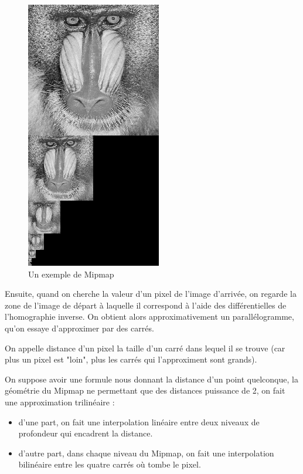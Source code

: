 \begin{figure}[h!]
\centering
\caption{Un exemple de Mipmap}
\includegraphics[scale=0.4]{MipMap_real} %
\end{figure}

Ensuite, quand on cherche la valeur d'un pixel de l'image d'arrivée, on regarde la zone de l'image de départ à laquelle il correspond à l'aide des différentielles de l'homographie inverse. On obtient alors approximativement un parallélogramme, qu'on essaye d'approximer par des carrés.


On appelle distance d'un pixel la taille d'un carré dans lequel il se trouve (car plus un pixel est "loin", plus les carrés qui l'approximent sont grands). 

On suppose avoir une formule nous donnant la distance d'un point quelconque, la géométrie du Mipmap ne permettant que des distances puissance de 2, on fait une approximation trilinéaire : 

\begin{itemize}
  \item d'une part, on fait une interpolation linéaire entre deux niveaux de profondeur qui encadrent la distance.
  \item d'autre part, dans chaque niveau du Mipmap, on fait une interpolation bilinéaire entre les quatre carrés où tombe le pixel.
\end{itemize}

